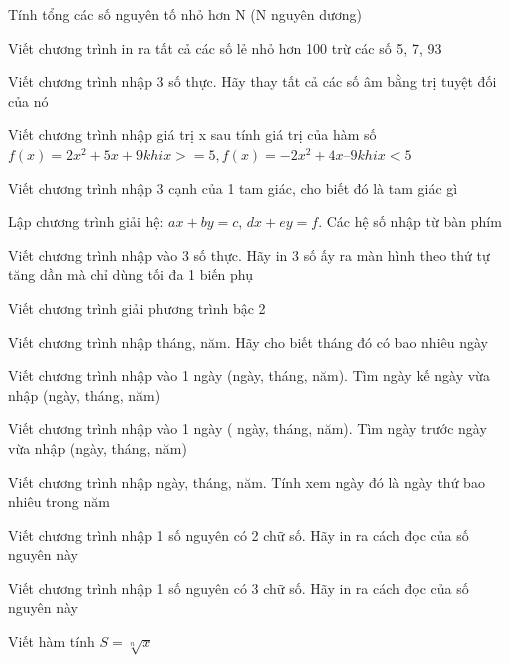 \begin{problem}
     Tính tổng các số nguyên tố nhỏ hơn N (N nguyên dương)
\end{problem}

\begin{problem}
    Viết chương trình in ra tất cả các số lẻ nhỏ hơn 100 trừ các số 5, 7, 93
\end{problem}

\begin{problem}
    Viết chương trình nhập 3 số thực. Hãy thay tất cả các số âm bằng trị tuyệt đối của nó
\end{problem}

\begin{problem}
    Viết chương trình nhập giá trị x sau tính giá trị của hàm số
$ f(x) = 2x^2 + 5x + 9 khi x >= 5, f(x) = -2x^2 + 4x – 9 khi x < 5$
\end{problem}

\begin{problem}
    Viết chương trình nhập 3 cạnh của 1 tam giác, cho biết đó là tam giác gì
\end{problem}
\begin{problem}
    Lập chương trình giải hệ: $ax + by = c$, $dx + ey = f$. Các hệ số nhập từ bàn phím
\end{problem}
\begin{problem}
    Viết chương trình nhập vào 3 số thực. Hãy in 3 số ấy ra màn hình theo thứ tự tăng dần mà chỉ dùng tối đa 1 biến phụ
\end{problem}
\begin{problem}
    Viết chương trình giải phương trình bậc 2
\end{problem}
\begin{problem}
     Viết chương trình nhập tháng, năm. Hãy cho biết tháng đó có bao nhiêu ngày
\end{problem}
\begin{problem}
    Viết chương trình nhập vào 1 ngày (ngày, tháng, năm). Tìm ngày kế ngày vừa nhập (ngày, tháng, năm)
\end{problem}
\begin{problem}
    Viết chương trình nhập vào 1 ngày ( ngày, tháng, năm). Tìm ngày trước ngày vừa nhập (ngày, tháng, năm)
\end{problem}
\begin{problem}
    Viết chương trình nhập ngày, tháng, năm. Tính xem ngày đó là ngày thứ bao nhiêu trong năm
\end{problem}
\begin{problem}
    Viết chương trình nhập 1 số nguyên có 2 chữ số. Hãy in ra cách đọc của số nguyên này
\end{problem}
\begin{problem}
    Viết chương trình nhập 1 số nguyên có 3 chữ số. Hãy in ra cách đọc của số nguyên này
\end{problem}
\begin{problem}
    Viết hàm tính $S = \sqrt[n]{x}$
\end{problem}

